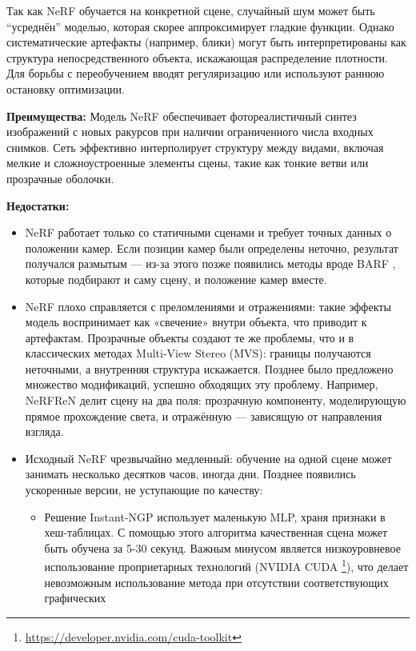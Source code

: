 Так как NeRF обучается на конкретной сцене, случайный шум может быть ``усреднён''
моделью, которая скорее аппроксимирует гладкие функции. Однако систематические
артефакты (например, блики) могут быть интерпретированы как структура
непосредственного объекта, искажающая распределение плотности. Для борьбы с
переобучением вводят регуляризацию или используют раннюю остановку оптимизации.

\textbf{Преимущества:}
Модель NeRF обеспечивает фотореалистичный синтез изображений с новых ракурсов
при наличии ограниченного числа входных снимков. Сеть эффективно интерполирует
структуру между видами, включая мелкие и сложноустроенные элементы сцены, такие
как тонкие ветви или прозрачные оболочки.

\textbf{Недостатки:}
\begin{itemize}
	\item NeRF работает только со статичными сценами и требует точных данных о
	положении камер. Если позиции камер были определены неточно, результат
	получался размытым — из-за этого позже появились методы вроде BARF
	\cite{lin2021barfbundleadjustingneuralradiance}, которые подбирают и саму
	сцену, и положение камер вместе.
	\item NeRF плохо справляется с преломлениями и отражениями: такие
	эффекты модель воспринимает как «свечение» внутри объекта, что приводит к
	артефактам. Прозрачные объекты создают те же проблемы, что и в классических
	методах Multi-View Stereo (MVS): границы получаются неточными, а внутренняя
	структура искажается. Позднее было предложено множество модификаций, успешно
	обходящих эту проблему. Например, NeRFReN
	\cite{guo2022nerfrenneuralradiancefields} делит сцену на два поля:
	прозрачную компоненту, моделирующую прямое прохождение света, и отражённую —
	зависящую от направления взгляда.
	\item Исходный NeRF чрезвычайно медленный: обучение на одной сцене может занимать
	несколько десятков часов, иногда дни. Позднее появились ускоренные версии, не уступающие
	по качеству:
	\begin{itemize}
		\item Решение Instant-NGP \cite{M_ller_2022} использует маленькую MLP, храня признаки в хеш-таблицах.
		С помощью этого алгоритма качественная сцена может быть обучена за 5-30 секунд.
		Важным минусом является низкоуровневое использование проприетарных технологий (NVIDIA CUDA \footnote{\url{https://developer.nvidia.com/cuda-toolkit}}),
		что делает невозможным использование метода при отсутствии соответствующих графических

\end{itemize}
\end{itemize}
